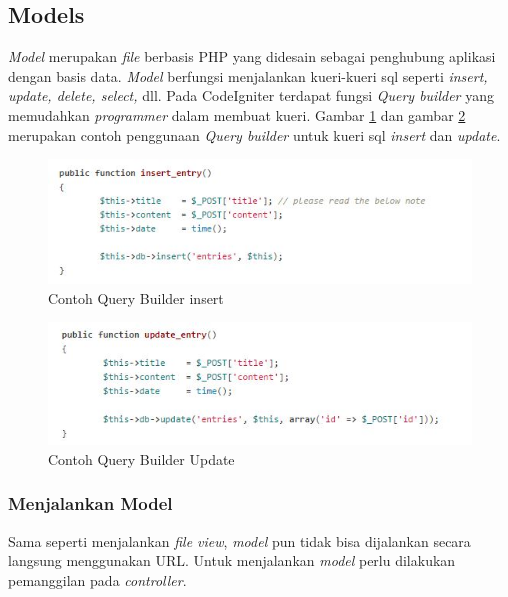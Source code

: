 	\subsection{Models}
	\label{sub: models}
	
	\textit{Model} merupakan \textit{file} berbasis PHP yang didesain sebagai penghubung aplikasi dengan basis data. \textit{Model} berfungsi menjalankan kueri-kueri sql seperti \textit{insert, update, delete, select,} dll.
	Pada CodeIgniter terdapat fungsi \textit{Query builder} yang memudahkan \textit{programmer} dalam membuat kueri. Gambar \ref{fig:insert} dan gambar \ref{fig:update} merupakan contoh penggunaan \textit{Query builder} untuk kueri sql \textit{insert} dan \textit{update}.
	
	\begin{figure}[H]
		\centering
		\includegraphics[scale=1]{Gambar/insert}
		\caption{Contoh Query Builder insert}
		\label{fig:insert}
	\end{figure}
	
	\begin{figure}[H]
		\centering
		\includegraphics[scale=1]{Gambar/update}
		\caption{Contoh Query Builder Update}
		\label{fig:update}
	\end{figure}
	
	\subsubsection{Menjalankan Model}
	\label{subsub: menjalankanModel}
		
	Sama seperti menjalankan \textit{file view}, \textit{model} pun tidak bisa dijalankan secara langsung menggunakan URL. Untuk menjalankan \textit{model} perlu dilakukan pemanggilan pada \textit{controller}.
	
